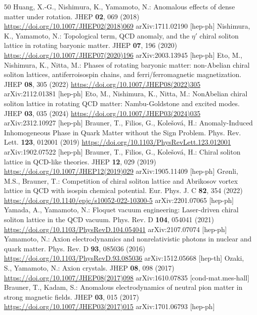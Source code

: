 \begin{thebibliography}{50}
 Huang, X.-G., Nishimura, K., Yamamoto, N.: Anomalous effects of dense matter under rotation. JHEP \textbf{02}, 069 (2018) \url{https://doi.org/10.1007/JHEP02(2018)069} arXiv:1711.02190 [hep-ph]
 Nishimura, K., Yamamoto, N.: Topological term, QCD anomaly, and the $\eta'$ chiral soliton lattice in rotating baryonic matter. JHEP \textbf{07}, 196 (2020) \url{https://doi.org/10.1007/JHEP07(2020)196} arXiv:2003.13945 [hep-ph]
 Eto, M., Nishimura, K., Nitta, M.: Phases of rotating baryonic matter: non-Abelian chiral soliton lattices, antiferroisospin chains, and ferri/ferromagnetic magnetization. JHEP \textbf{08}, 305 (2022) \url{https://doi.org/10.1007/JHEP08(2022)305} arXiv:2112.01381 [hep-ph]
 Eto, M., Nishimura, K., Nitta, M.: NonAbelian chiral soliton lattice in rotating QCD matter: Nambu-Goldstone and excited modes. JHEP \textbf{03}, 035 (2024) \url{https://doi.org/10.1007/JHEP03(2024)035} arXiv:2312.10927 [hep-ph]
 Brauner, T., Filios, G., Kole\v{s}ov\'a, H.: Anomaly-Induced Inhomogeneous Phase in Quark Matter without the Sign Problem. Phys. Rev. Lett. \textbf{123}, 012001 (2019) \url{https://doi.org/10.1103/PhysRevLett.123.012001} arXiv:1902.07522 [hep-ph]
 Brauner, T., Filios, G., Kole\v{s}ov\'a, H.: Chiral soliton lattice in QCD-like theories. JHEP \textbf{12}, 029 (2019) \url{https://doi.org/10.1007/JHEP12(2019)029} arXiv:1905.11409 [hep-ph]
 Gr{\o}nli, M.S., Brauner, T.: Competition of chiral soliton lattice and Abrikosov vortex lattice in QCD with isospin chemical potential. Eur. Phys. J. C \textbf{82}, 354 (2022) \url{https://doi.org/10.1140/epjc/s10052-022-10300-5} arXiv:2201.07065 [hep-ph]
 Yamada, A., Yamamoto, N.: Floquet vacuum engineering: Laser-driven chiral soliton lattice in the QCD vacuum. Phys. Rev. D \textbf{104}, 054041 (2021) \url{https://doi.org/10.1103/PhysRevD.104.054041} arXiv:2107.07074 [hep-ph]
 Yamamoto, N.: Axion electrodynamics and nonrelativistic photons in nuclear and quark matter. Phys. Rev. D \textbf{93}, 085036 (2016) \url{https://doi.org/10.1103/PhysRevD.93.085036} arXiv:1512.05668 [hep-th]
 Ozaki, S., Yamamoto, N.: Axion crystals. JHEP \textbf{08}, 098 (2017) \url{https://doi.org/10.1007/JHEP08(2017)098} arXiv:1610.07835 [cond-mat.mes-hall]
 Brauner, T., Kadam, S.: Anomalous electrodynamics of neutral pion matter in strong magnetic fields. JHEP \textbf{03}, 015 (2017) \url{https://doi.org/10.1007/JHEP03(2017)015} arXiv:1701.06793 [hep-ph]

\end{thebibliography}
